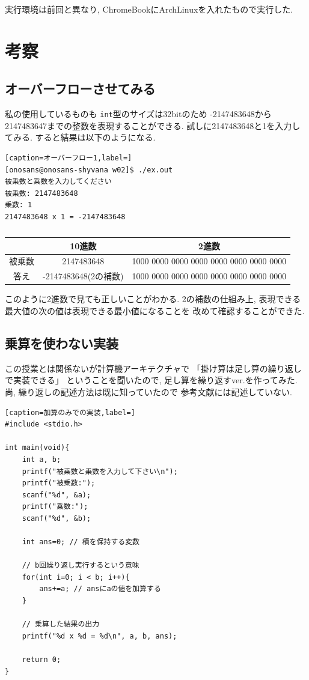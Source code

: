 \documentclass[a4paper, xelatex, ja=standard]{bxjsarticle}
\begin{document}
実行環境は前回と異なり, 
ChromeBookにArchLinuxを入れたもので実行した.

\section{考察}
\subsection{オーバーフローさせてみる}
私の使用しているものも
\texttt{int}型のサイズは32bitのため
-2147483648から2147483647までの整数を表現することができる.
試しに2147483648と1を入力してみる.
すると結果は以下のようになる.
\begin{lstlisting}[caption=オーバーフロー1,label=]
[onosans@onosans-shyvana w02]$ ./ex.out
被乗数と乗数を入力してください
被乗数: 2147483648
乗数: 1
2147483648 x 1 = -2147483648
\end{lstlisting}

\begin{table}[h]
  \centering
  \caption{}
  \label{}
  \begin{tabular}{|c||c|c|}
  \hline
  & 10進数 & 2進数 \\ \hline
  被乗数 & 2147483648 & 1000 0000 0000 0000 0000 0000 0000 0000 \\ \hline
  答え & -2147483648(2の補数) & 1000 0000 0000 0000 0000 0000 0000 0000 \\ \hline
  \end{tabular}
\end{table}
このように2進数で見ても正しいことがわかる.
2の補数の仕組み上,
表現できる最大値の次の値は表現できる最小値になることを
改めて確認することができた.


\subsection{乗算を使わない実装}
この授業とは関係ないが計算機アーキテクチャで
「掛け算は足し算の繰り返しで実装できる」
ということを聞いたので,
足し算を繰り返すver.を作ってみた.
尚, 繰り返しの記述方法は既に知っていたので
参考文献には記述していない.
\begin{lstlisting}[caption=加算のみでの実装,label=]
#include <stdio.h>

int main(void){
	int a, b;
	printf("被乗数と乗数を入力して下さい\n");
	printf("被乗数:");
	scanf("%d", &a);
	printf("乗数:");
	scanf("%d", &b);

	int ans=0; // 積を保持する変数

	// b回繰り返し実行するという意味
	for(int i=0; i < b; i++){
		ans+=a; // ansにaの値を加算する
	}

	// 乗算した結果の出力
	printf("%d x %d = %d\n", a, b, ans);

	return 0;
}
\end{lstlisting}
\end{document}
